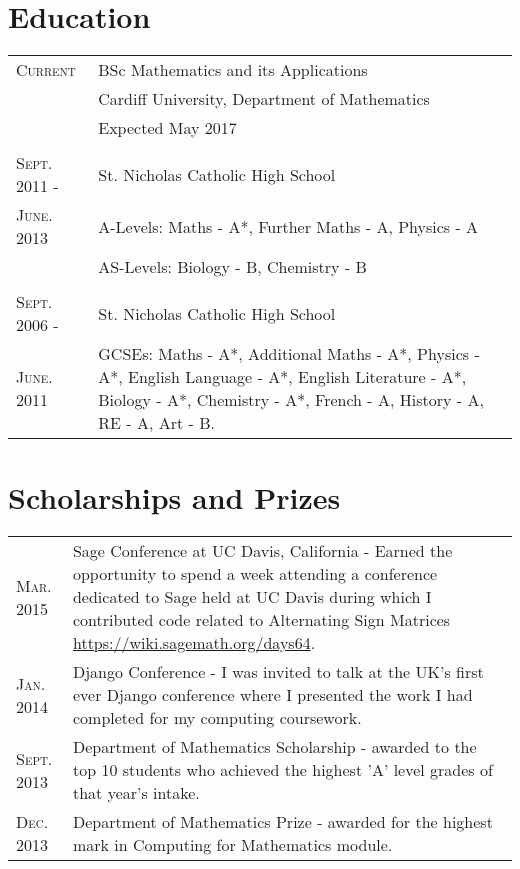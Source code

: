 \documentclass[a4paper]{article}
\begin{document}
\section{Education}
\begin{tabularx}{\textwidth}{lX}

\textsc{Current} & \textsc BSc Mathematics and its Applications \\
&\normalsize Cardiff University, Department of Mathematics\\
& Expected May 2017\\
\\
\textsc{Sept. 2011 -} & St. Nicholas Catholic High School\\
\textsc{June. 2013} & A-Levels: Maths - A*, Further Maths - A, Physics - A\\
& AS-Levels: Biology - B, Chemistry - B\\
\\
\textsc{Sept. 2006 -} & St. Nicholas Catholic High School\\
\textsc{June. 2011} & GCSEs: Maths - A*, Additional Maths - A*, Physics - A*, English Language - A*, English Literature - A*, Biology - A*, Chemistry - A*, French - A, History - A, RE - A, Art - B.\\

\end{tabularx}
\section{Scholarships and Prizes}
\begin{tabularx}{\textwidth}{lX}

\textsc{Mar.} 2015 & Sage Conference at UC Davis, California - Earned the opportunity to spend a week attending a conference dedicated to Sage held at UC Davis during which I contributed code related to Alternating Sign Matrices \url{https://wiki.sagemath.org/days64}.\\
\textsc{Jan.} 2014 & Django Conference - I was invited to talk at the UK's first ever Django conference where I presented the work I had completed for my computing coursework.\\
\textsc{Sept.} 2013 & Department of Mathematics Scholarship - awarded to the top 10 students who achieved the highest 'A' level grades of that year's intake.\\
\textsc{Dec.} 2013 & Department of Mathematics Prize - awarded for the highest mark in Computing for Mathematics module.\\


\end{tabularx}
\end{document}
